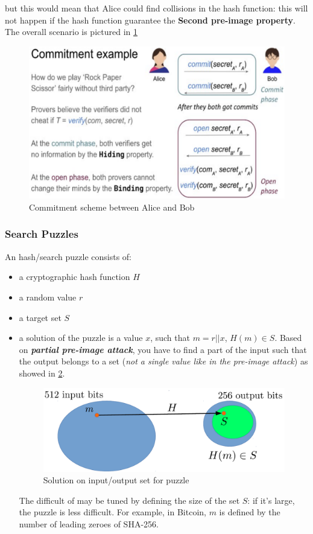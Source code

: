 \documentclass[10pt,a4paper]{report}
\begin{document}
but this would mean that Alice could find collisions in the hash function: this will not happen if the hash function guarantee the \textbf{Second pre-image property}. The overall scenario is pictured in \ref{alice-bob-commitment}

	\begin{figure}[b!]
		\centering
	\includegraphics[scale=0.30]{images/Pasted image 20230319111359.png}
	\caption{Commitment scheme between Alice and Bob}
	\label{alice-bob-commitment}
\end{figure}


\subsubsection{Search Puzzles}\label{sec:search-puzzles}
An hash/search puzzle consists of:
\begin{itemize}
	\item 
	a cryptographic hash function $H$
	\item 
	a random value $r$
	\item 
	a target set $S$
	\item 
	a solution of the puzzle is a value $x$, such that $m =  r||x$, $H(m) \in S$.
	Based on \textit{\textbf{partial pre-image attack}}, you have to find a part of the input such that the output belongs to a set (\textit{not a single value like in the pre-image attack}) as showed in \ref{set-size}.
	\begin{figure}[h!]
		\centering
		\includegraphics[scale=0.30]{images/Pasted image 20230319111651.png}
		\caption{Solution on input/output set for puzzle}
		\label{set-size}	
\end{figure}
	
	The difficult of may be tuned by defining the size of the set $S$: if it's large, the puzzle is less difficult. For example, in Bitcoin, $m$ is defined by the number of leading zeroes of SHA-256.
\end{itemize}
\end{document}
